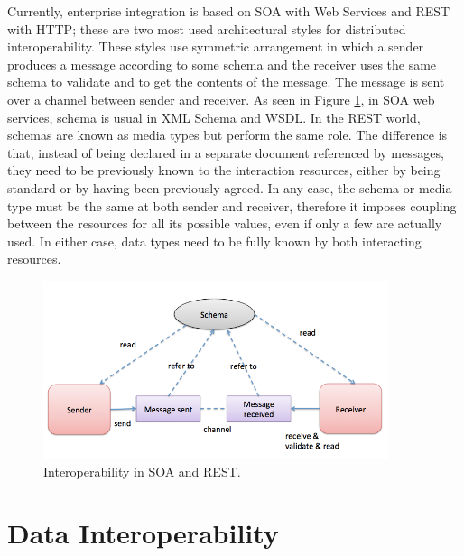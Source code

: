  Currently, enterprise integration is based on SOA with Web Services and REST with HTTP; these are two most used architectural styles for distributed interoperability. These styles use symmetric arrangement in which a sender produces a message according to some schema and the receiver uses the same schema to validate and to get the contents of the message. The message is sent over a channel between sender and receiver. As seen in Figure \ref{fig:interoperability}, in SOA web services, schema is usual in XML Schema and WSDL. In the REST world, schemas are known as media types but perform the same role. The difference is that, instead of being declared in a separate document referenced by messages, they need to be previously known to the interaction resources, either by being standard or by having been previously agreed. In any case, the schema or media type must be the same at both sender and receiver, therefore it imposes coupling between the resources for all its possible values, even if only a few are actually used. In either case, data types need to be fully known by both interacting resources.
\begin{figure}[!htb]
  \centering
  \includegraphics[width=0.9\textwidth]{Figures/schema.png}
  \caption[Interoperability in SOA and REST.]{Interoperability in SOA and REST.}
  \label{fig:interoperability}
\end{figure}


\section{Data Interoperability}
\label{section:InteroperabilityData}

